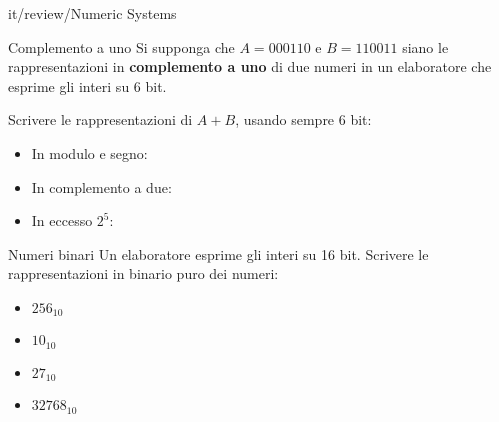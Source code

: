 \documentclass[11pt]{article}
\begin{document}
\begin{quiz}{it/review/Numeric Systems}
\begin{cloze}[points=1,shuffle=false]{Complemento a uno}
Si supponga che $A = 000110$ e $B = 110011$ siano le rappresentazioni in \textbf{complemento a uno} di due numeri in un elaboratore che esprime gli interi su 6 bit.

Scrivere le rappresentazioni di $A+B$, usando sempre 6 bit:

\begin{itemize}
\item In modulo e segno: 
\item In complemento a due: 
\item In eccesso $2^5$: 
\end{itemize}
\end{cloze}

\begin{cloze}[points=1,shuffle=false]{Numeri binari}
Un elaboratore esprime gli interi su 16 bit. Scrivere le rappresentazioni in binario puro dei numeri:

\begin{itemize}
\item $256_{10}$ 
\item $10_{10}$  
\item $27_{10}$  
\item $32768_{10}$ 
\end{itemize}
\end{cloze}


\end{quiz}
\end{document}
